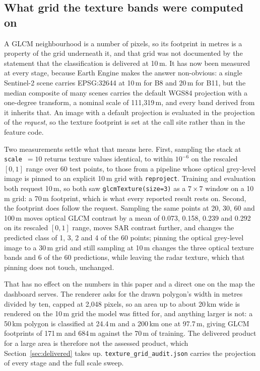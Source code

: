 \documentclass[conference]{IEEEtran}
\begin{document}
\subsection{What grid the texture bands were computed on}
\label{sec:texture_grid}
A GLCM neighbourhood is a number of pixels, so its footprint in metres is a property of the grid underneath it, and that grid was not documented by the statement that the classification is delivered at 10\,m. It has now been measured at every stage, because Earth Engine makes the answer non-obvious: a single Sentinel-2 scene carries EPSG:32644 at 10\,m for B8 and 20\,m for B11, but the median composite of many scenes carries the default WGS84 projection with a one-degree transform, a nominal scale of 111{,}319\,m, and every band derived from it inherits that. An image with a default projection is evaluated in the projection of the \emph{request}, so the texture footprint is set at the call site rather than in the feature code.

Two measurements settle what that means here. First, sampling the stack at \texttt{scale}~$=10$ returns texture values identical, to within $10^{-6}$ on the rescaled $[0,1]$ range over 60 test points, to those from a pipeline whose optical grey-level image is pinned to an explicit 10\,m grid with \texttt{reproject}. Training and evaluation both request 10\,m, so both saw \texttt{glcmTexture(size=3)} as a $7\times7$ window on a 10\,m grid: a 70\,m footprint, which is what every reported result rests on. Second, the footprint does follow the request. Sampling the same points at 20, 30, 60 and 100\,m moves optical GLCM contrast by a mean of 0.073, 0.158, 0.239 and 0.292 on its rescaled $[0,1]$ range, moves SAR contrast further, and changes the predicted class of 1, 3, 2 and 4 of the 60 points; pinning the optical grey-level image to a 30\,m grid and still sampling at 10\,m changes the three optical texture bands and 6 of the 60 predictions, while leaving the radar texture, which that pinning does not touch, unchanged.

That has no effect on the numbers in this paper and a direct one on the map the dashboard serves. The renderer asks for the drawn polygon's width in metres divided by ten, capped at 2{,}048 pixels, so an area up to about 20\,km wide is rendered on the 10\,m grid the model was fitted for, and anything larger is not: a 50\,km polygon is classified at 24.4\,m and a 200\,km one at 97.7\,m, giving GLCM footprints of 171\,m and 684\,m against the 70\,m of training. The delivered product for a large area is therefore not the assessed product, which Section~\ref{sec:delivered} takes up. \texttt{texture\_grid\_audit.json} carries the projection of every stage and the full scale sweep.
\end{document}
